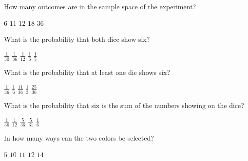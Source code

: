 \documentclass[answers,12pt]{exam}
\begin{document}
\begin{questions}

\question\label{FirstDice}
How many outcomes are in the sample space of the experiment?\\
\begin{oneparchoices}
\choice $6$ %
\choice $11$ %
\choice $12$ %
\choice $18$
\correctchoice $36$
\end{oneparchoices}

\question What is the probability that both dice show six?\\
\begin{oneparchoices}
\choice $\frac{1}{30}$ %
\correctchoice $\frac{1}{36}$
\choice $\frac{1}{12}$ %
\choice $\frac{1}{6}$
\choice $\frac{1}{5}$ %
\end{oneparchoices}

\question
What is the probability that at least one die shows six?\\
\begin{oneparchoices}
\choice $\frac{1}{36}$
\choice $\frac{1}{6}$
\correctchoice $\frac{11}{36}$
\choice $\frac{1}{3}$ %
\choice $\frac{25}{36}$ %
\end{oneparchoices}

\question\label{LastDice}
What is the probability that six is the sum of the numbers
showing on the dice?\\
\begin{oneparchoices}
\choice $\frac{1}{36}$
\choice $\frac{1}{12}$ %
\correctchoice $\frac{5}{36}$
\choice $\frac{5}{31}$ %
\choice $\frac{1}{6}$
\end{oneparchoices}


\question\label{FirstColor}
In how many ways can the two colors be selected?\\
\begin{oneparchoices}
\choice $5$ %
\correctchoice $10$
\choice $11$ %
\choice $12$ %
\choice $14$ %
\end{oneparchoices}


\end{questions}
\end{document}
